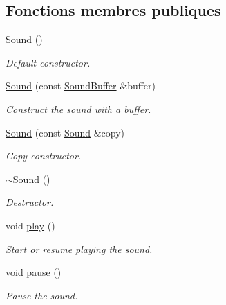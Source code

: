 \subsection*{Fonctions membres publiques}
\begin{DoxyCompactItemize}
\item 
\mbox{\label{classsf_1_1Sound_a36ab74beaaa953d9879c933ddd246282}} 
\hyperlink{classsf_1_1Sound_a36ab74beaaa953d9879c933ddd246282}{Sound} ()
\begin{DoxyCompactList}\small\item\em Default constructor. \end{DoxyCompactList}\item 
\hyperlink{classsf_1_1Sound_a3b1cfc19a856d4ff8c079ee41bb78e69}{Sound} (const \hyperlink{classsf_1_1SoundBuffer}{Sound\+Buffer} \&buffer)
\begin{DoxyCompactList}\small\item\em Construct the sound with a buffer. \end{DoxyCompactList}\item 
\hyperlink{classsf_1_1Sound_ae05eeed6377932694d86b3011be366c0}{Sound} (const \hyperlink{classsf_1_1Sound}{Sound} \&copy)
\begin{DoxyCompactList}\small\item\em Copy constructor. \end{DoxyCompactList}\item 
\mbox{\label{classsf_1_1Sound_ad0792c35310eba2dffd8489c80fad076}} 
\hyperlink{classsf_1_1Sound_ad0792c35310eba2dffd8489c80fad076}{$\sim$\+Sound} ()
\begin{DoxyCompactList}\small\item\em Destructor. \end{DoxyCompactList}\item 
void \hyperlink{classsf_1_1Sound_a2953ffe632536e72e696fd880ced2532}{play} ()
\begin{DoxyCompactList}\small\item\em Start or resume playing the sound. \end{DoxyCompactList}\item 
void \hyperlink{classsf_1_1Sound_a5eeb25815bfa8cdc4a6cc000b7b19ad5}{pause} ()
\begin{DoxyCompactList}\small\item\em Pause the sound. \end{DoxyCompactList}\item 

\end{DoxyCompactItemize}
